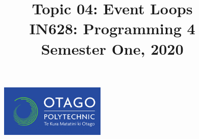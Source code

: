 \documentclass{article}
\author{}
\begin{document}
\begin{figure}
  \includegraphics[width=50mm]{../../resources/img/logo.png}
\end{figure}

\title{Topic 04: Event Loops\\IN628: Programming 4\\Semester One, 2020}
\date{}
\maketitle
\end{document}
